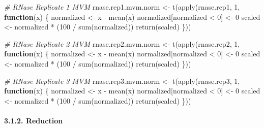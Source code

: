 \documentclass[
]{article}
\newenvironment{Shaded}{\begin{snugshade}}{\end{snugshade}}
\newcommand{\CommentTok}[1]{\textcolor[rgb]{0.56,0.35,0.01}{\textit{#1}}}
\newcommand{\ControlFlowTok}[1]{\textcolor[rgb]{0.13,0.29,0.53}{\textbf{#1}}}
\newcommand{\DecValTok}[1]{\textcolor[rgb]{0.00,0.00,0.81}{#1}}
\newcommand{\FunctionTok}[1]{\textcolor[rgb]{0.00,0.00,0.00}{#1}}
\newcommand{\NormalTok}[1]{#1}
\newcommand{\OtherTok}[1]{\textcolor[rgb]{0.56,0.35,0.01}{#1}}
\newcommand{\SpecialCharTok}[1]{\textcolor[rgb]{0.00,0.00,0.00}{#1}}
\begin{document}
\begin{Shaded}
\begin{Highlighting}[]
\CommentTok{\# RNase Replicate 1 MVM}
\NormalTok{rnase.rep1.mvm.norm }\OtherTok{\textless{}{-}} \FunctionTok{t}\NormalTok{(}\FunctionTok{apply}\NormalTok{(rnase.rep1, }\DecValTok{1}\NormalTok{, }\ControlFlowTok{function}\NormalTok{(x) \{}
\NormalTok{  normalized }\OtherTok{\textless{}{-}}\NormalTok{ x }\SpecialCharTok{{-}} \FunctionTok{mean}\NormalTok{(x)}
\NormalTok{  normalized[normalized }\SpecialCharTok{\textless{}} \DecValTok{0}\NormalTok{] }\OtherTok{\textless{}{-}} \DecValTok{0}
\NormalTok{  scaled }\OtherTok{\textless{}{-}}\NormalTok{ normalized }\SpecialCharTok{*}\NormalTok{ (}\DecValTok{100} \SpecialCharTok{/} \FunctionTok{sum}\NormalTok{(normalized))}
  \FunctionTok{return}\NormalTok{(scaled)}
\NormalTok{\}))}

\CommentTok{\# RNase Replicate 2 MVM}
\NormalTok{rnase.rep2.mvm.norm }\OtherTok{\textless{}{-}} \FunctionTok{t}\NormalTok{(}\FunctionTok{apply}\NormalTok{(rnase.rep2, }\DecValTok{1}\NormalTok{, }\ControlFlowTok{function}\NormalTok{(x) \{}
\NormalTok{  normalized }\OtherTok{\textless{}{-}}\NormalTok{ x }\SpecialCharTok{{-}} \FunctionTok{mean}\NormalTok{(x)}
\NormalTok{  normalized[normalized }\SpecialCharTok{\textless{}} \DecValTok{0}\NormalTok{] }\OtherTok{\textless{}{-}} \DecValTok{0}
\NormalTok{  scaled }\OtherTok{\textless{}{-}}\NormalTok{ normalized }\SpecialCharTok{*}\NormalTok{ (}\DecValTok{100} \SpecialCharTok{/} \FunctionTok{sum}\NormalTok{(normalized))}
  \FunctionTok{return}\NormalTok{(scaled)}
\NormalTok{\}))}

\CommentTok{\# RNase Replicate 3 MVM}
\NormalTok{rnase.rep3.mvm.norm }\OtherTok{\textless{}{-}} \FunctionTok{t}\NormalTok{(}\FunctionTok{apply}\NormalTok{(rnase.rep3, }\DecValTok{1}\NormalTok{, }\ControlFlowTok{function}\NormalTok{(x) \{}
\NormalTok{  normalized }\OtherTok{\textless{}{-}}\NormalTok{ x }\SpecialCharTok{{-}} \FunctionTok{mean}\NormalTok{(x)}
\NormalTok{  normalized[normalized }\SpecialCharTok{\textless{}} \DecValTok{0}\NormalTok{] }\OtherTok{\textless{}{-}} \DecValTok{0}
\NormalTok{  scaled }\OtherTok{\textless{}{-}}\NormalTok{ normalized }\SpecialCharTok{*}\NormalTok{ (}\DecValTok{100} \SpecialCharTok{/} \FunctionTok{sum}\NormalTok{(normalized))}
  \FunctionTok{return}\NormalTok{(scaled)}
\NormalTok{\}))}
\end{Highlighting}
\end{Shaded}

\hypertarget{reduction}{%
\paragraph{3.1.2. Reduction}\label{reduction}}
\end{document}
